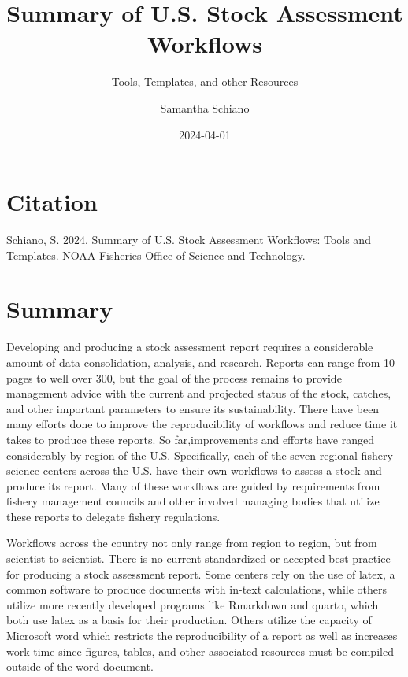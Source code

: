\documentclass[
  letterpaper,
  DIV=11,
  numbers=noendperiod]{scrreprt}
\title{Summary of U.S. Stock Assessment Workflows}
\subtitle{Tools, Templates, and other Resources}
\author{Samantha Schiano}
\date{2024-04-01}
\renewcommand*\contentsname{Table of contents}
\newcommand\contentsname{Table of contents}
\begin{document}
\maketitle

\renewcommand*\contentsname{Table of contents}
{
\hypersetup{linkcolor=}
\setcounter{tocdepth}{2}
\tableofcontents
}

\chapter*{Citation}\label{citation}


Schiano, S. 2024. Summary of U.S. Stock Assessment Workflows: Tools and
Templates. NOAA Fisheries Office of Science and Technology.


\chapter{Summary}\label{summary}

Developing and producing a stock assessment report requires a
considerable amount of data consolidation, analysis, and research.
Reports can range from 10 pages to well over 300, but the goal of the
process remains to provide management advice with the current and
projected status of the stock, catches, and other important parameters
to ensure its sustainability. There have been many efforts done to
improve the reproducibility of workflows and reduce time it takes to
produce these reports. So far,improvements and efforts have ranged
considerably by region of the U.S. Specifically, each of the seven
regional fishery science centers across the U.S. have their own
workflows to assess a stock and produce its report. Many of these
workflows are guided by requirements from fishery management councils
and other involved managing bodies that utilize these reports to
delegate fishery regulations.

Workflows across the country not only range from region to region, but
from scientist to scientist. There is no current standardized or
accepted best practice for producing a stock assessment report. Some
centers rely on the use of latex, a common software to produce documents
with in-text calculations, while others utilize more recently developed
programs like Rmarkdown and quarto, which both use latex as a basis for
their production. Others utilize the capacity of Microsoft word which
restricts the reproducibility of a report as well as increases work time
since figures, tables, and other associated resources must be compiled
outside of the word document.
\end{document}
